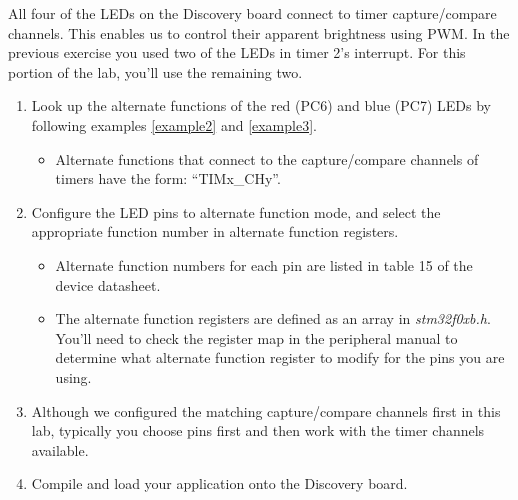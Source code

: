 \documentclass[openany,11pt,fleqn]{book} %
\begin{document}
\begin{exercise} 
    All four of the LEDs on the Discovery board connect to timer capture/compare channels. This enables us to control their apparent brightness using PWM. In the previous exercise you used two of the LEDs in timer 2's interrupt. For this portion of the lab, you'll use the remaining two. 
    
    \begin{enumerate}
        \item Look up the alternate functions of the red (PC6) and blue (PC7) LEDs by following examples \ref{example2} and \ref{example3}. 
        \begin{itemize}
            \item Alternate functions that connect to the capture/compare channels of timers have the form: ``TIMx\_CHy''.
        \end{itemize}
        \item Configure the LED pins to alternate function mode, and select the appropriate function number in alternate function registers.
        \begin{itemize}
            \item Alternate function numbers for each pin are listed in table 15 of the device datasheet.
            \item The alternate function registers are defined as an array in \textit{stm32f0xb.h}. You'll need to check the register map in the peripheral manual to determine what alternate function register to modify for the pins you are using. 
        \end{itemize}
        \item Although we configured the matching capture/compare channels first in this lab, typically you choose pins first and then work with the timer channels available. 
        \item Compile and load your application onto the Discovery board. 
    \end{enumerate} 
\end{exercise}    
    
\end{document}
